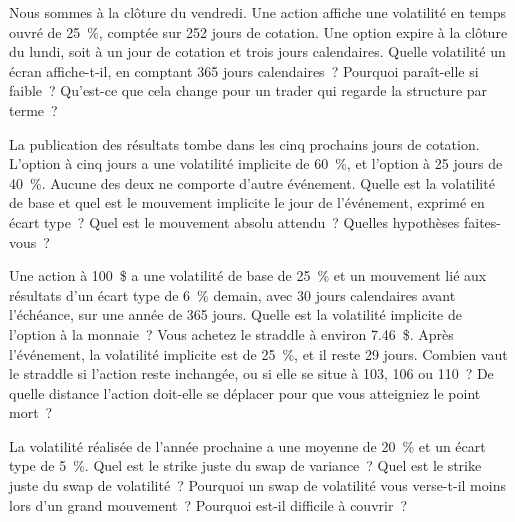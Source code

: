\begin{question}\label{iq:iv2:vol-surface-and-vol-trading:17}
Nous sommes à la clôture du vendredi. Une action affiche une volatilité en temps ouvré de 25~\%, comptée sur 252 jours de cotation. Une option expire à la clôture du lundi, soit à un jour de cotation et trois jours calendaires. Quelle volatilité un écran affiche-t-il, en comptant 365 jours calendaires~? Pourquoi paraît-elle si faible~? Qu'est-ce que cela change pour un trader qui regarde la structure par terme~?
\end{question}

\begin{question}\label{iq:iv2:vol-surface-and-vol-trading:18}
La publication des résultats tombe dans les cinq prochains jours de cotation. L'option à cinq jours a une volatilité implicite de 60~\%, et l'option à 25 jours de 40~\%. Aucune des deux ne comporte d'autre événement. Quelle est la volatilité de base et quel est le mouvement implicite le jour de l'événement, exprimé en écart type~? Quel est le mouvement absolu attendu~? Quelles hypothèses faites-vous~?
\end{question}

\begin{question}\label{iq:iv2:vol-surface-and-vol-trading:19}
Une action à 100~\$ a une volatilité de base de 25~\% et un mouvement lié aux résultats d'un écart type de 6~\% demain, avec 30 jours calendaires avant l'échéance, sur une année de 365 jours. Quelle est la volatilité implicite de l'option à la monnaie~? Vous achetez le straddle à environ 7.46~\$. Après l'événement, la volatilité implicite est de 25~\%, et il reste 29 jours. Combien vaut le straddle si l'action reste inchangée, ou si elle se situe à 103, 106 ou 110~? De quelle distance l'action doit-elle se déplacer pour que vous atteigniez le point mort~?
\end{question}

\begin{question}\label{iq:iv2:vol-surface-and-vol-trading:20}
La volatilité réalisée de l'année prochaine a une moyenne de 20~\% et un écart type de 5~\%. Quel est le strike juste du swap de variance~? Quel est le strike juste du swap de volatilité~? Pourquoi un swap de volatilité vous verse-t-il moins lors d'un grand mouvement~? Pourquoi est-il difficile à couvrir~?
\end{question}


